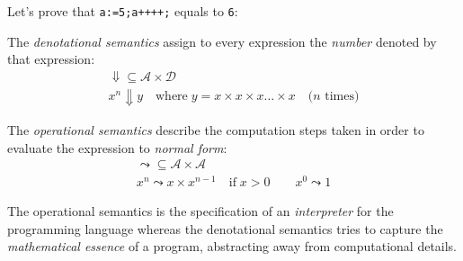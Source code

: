 \documentclass{article}
\begin{document}
\plush{}


Let's prove that \texttt{a:=5;a++++;} equals to \texttt{6}:
\begin{pptWideOne}
\small\begin{prooftree}
\end{prooftree}
\end{pptWideOne}

\plush{}


The \emph{denotational semantics} assign to every expression the \emph{number} denoted by that expression:
\begin{gather*}
\mathrel{\bm{\Downarrow}} \subseteq \mathcal{A} \times \mathcal{D} \\
x^n \bm{\Downarrow} y \quad\text{where}\; y = x \times x \times x \dots \times x \quad\text{($n$ times)}
\end{gather*}

The \emph{operational semantics} describe the computation steps taken in order to evaluate the expression to \emph{normal form}:
\begin{gather*}
\mathrel{\bm{\leadsto}} \subseteq \mathcal{A} \times \mathcal{A} \\
x^n \bm{\leadsto} x \times x^{n-1} \quad\text{if}\; x > 0 \quad\quad x^0 \bm{\leadsto} 1
\end{gather*}

The operational semantics is the specification of an \emph{interpreter} for the programming language whereas the denotational semantics tries to capture the \emph{mathematical essence} of a program, abstracting away from computational details.

\plush{}

\end{document}
